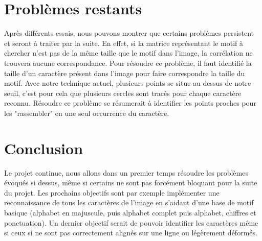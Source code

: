 \documentclass[a4paper,12pt,titlepage]{report}
\begin{document}
	\section{Problèmes restants}
	Après différents essais, nous pouvons montrer que certains problèmes persistent et seront à traiter par la suite.
	En effet, si la matrice représentant le motif à chercher n'est pas de la même taille que le motif dans l'image, la corrélation ne trouvera aucune correspondance. Pour résoudre ce problème, il faut identifié la taille d'un caractère présent dans l'image pour faire correspondre la taille du motif.
	Avec notre technique actuel, plusieurs points se situe au dessus de notre seuil, c'est pour cela que plusieurs cercles sont tracés pour chaque caractère reconnu. Résoudre ce problème se résumerait à identifier les points proches pour les "rassembler" en une seul occurrence du caractère.
	\section*{Conclusion}
	Le projet continue, nous allons dans un premier temps résoudre les problèmes évoqués si dessus, même si certains ne sont pas forcément bloquant pour la suite du projet.
	Les prochains objectifs sont par exemple implémenter une reconnaissance de tous les caractères de l'image en s'aidant d'une base de motif basique (alphabet en majuscule, puis alphabet complet puis alphabet, chiffres et ponctuation).
	Un dernier objectif serait de pouvoir identifier les caractères même si ceux si ne sont pas correctement alignés sur une ligne ou légèrement déformés.
\end{document}
